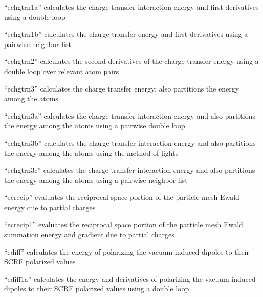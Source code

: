 \documentclass[letterpaper,11pt,english]{sphinxmanual}
\begin{document}
“echgtrn1a” calculates the charge transfer interaction energy
and first derivatives using a double loop


“echgtrn1b” calculates the charge transfer energy and first
derivatives using a pairwise neighbor list


“echgtrn2” calculates the second derivatives of the charge
transfer energy using a double loop over relevant atom pairs


“echgtrn3” calculates the charge transfer energy; also partitions
the energy among the atoms


“echgtrn3a” calculates the charge transfer interaction energy
and also partitions the energy among the atoms using a pairwise
double loop


“echgtrn3b” calculates the charge transfer interaction energy
and also partitions the energy among the atoms using the method
of lights


“echgtrn3c” calculates the charge transfer interaction energy
and also partitions the energy among the atoms using a pairwise
neighbor list


“ecrecip” evaluates the reciprocal space portion of the particle
mesh Ewald energy due to partial charges


“ecrecip1” evaluates the reciprocal space portion of the particle
mesh Ewald summation energy and gradient due to partial charges


“ediff” calculates the energy of polarizing the vacuum induced
dipoles to their SCRF polarized values


“ediff1a” calculates the energy and derivatives of polarizing
the vacuum induced dipoles to their SCRF polarized values using
a double loop

\end{document}
